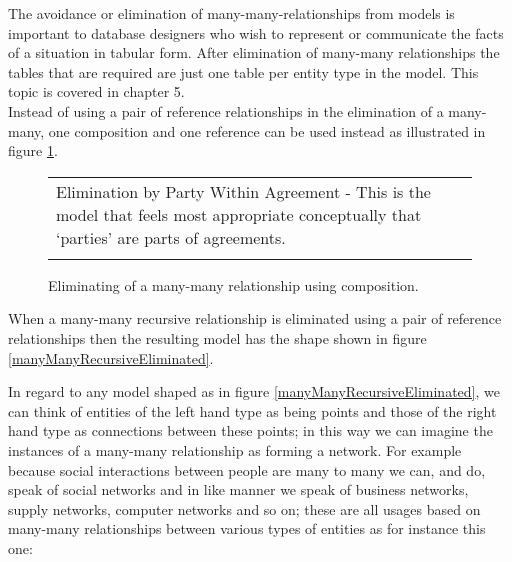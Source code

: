 
\noindent The avoidance or elimination of many-many-relationships from models is important to database designers who wish to represent or communicate the facts of a situation in tabular form. After elimination of many-many relationships the tables that are required are just one table per entity type in the model. This topic is covered in chapter 5. \\

\noindent Instead of using a pair of reference relationships in the elimination of a many-many, one composition and one reference can be used instead as illustrated in figure \ref{manyvaluedAgreement2}.

\begin{figure}[H]
\begin{erbox}
\vspace{0.3cm}
\caption{Eliminating of a many-many relationship using composition.}
\label{manyvaluedAgreement2}
\begin{center}
\small
\begin{tabular}{p{3cm}  c  p{5.5cm}}
Elimination by Party Within Agreement - This is the model that feels most appropriate conceptually that `parties' are parts of agreements. & & \raisebox{-3.0cm}{
} \\
\\
\end{tabular}
\normalsize
\end{center}
\end{erbox}
\end{figure}



\noindent When a many-many recursive relationship is eliminated using a pair of reference relationships then the resulting model has the shape 
shown in figure \ref{manyManyRecursiveEliminated}. \\

\noindent In regard to any model shaped as in figure \ref{manyManyRecursiveEliminated}, we can think of entities of the left hand type as being points and those of the right hand type as connections between these points; in this way we can imagine the instances of a many-many relationship as forming a network. For example because social interactions between people are many to many we can, and do, speak of social networks and in like manner we speak of business networks, supply networks, computer networks and so on; these are all usages based on many-many relationships between various types of entities as for instance this one: 

